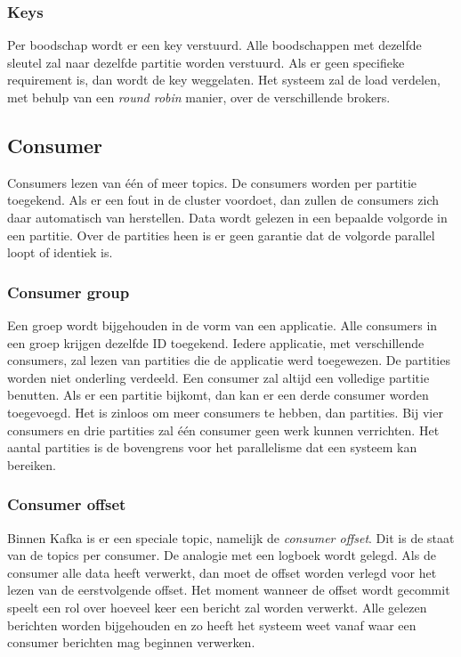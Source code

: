 \documentclass[a4paper,10pt,twoside]{report}
\begin{document}
\subsubsection{Keys}

Per boodschap wordt er een key verstuurd. Alle boodschappen met dezelfde sleutel zal naar dezelfde partitie worden verstuurd. Als er geen specifieke requirement is, dan wordt de key weggelaten. Het systeem zal de load verdelen, met behulp van een \textit{round robin} manier, over de verschillende brokers.

\subsection{Consumer}

Consumers lezen van één of meer topics. De consumers worden per partitie toegekend. Als er een fout in de cluster voordoet, dan zullen de consumers zich daar automatisch van herstellen. Data wordt gelezen in een bepaalde volgorde in een partitie. Over de partities heen is er geen garantie dat de volgorde parallel loopt of identiek is.

\subsubsection{Consumer group}

Een groep wordt bijgehouden in de vorm van een applicatie. Alle consumers in een groep krijgen dezelfde ID toegekend. Iedere applicatie, met verschillende consumers, zal lezen van partities die de applicatie werd toegewezen. De partities worden niet onderling verdeeld. Een consumer zal altijd een volledige partitie benutten. Als er een partitie bijkomt, dan kan er een derde consumer worden toegevoegd. Het is zinloos om meer consumers te hebben, dan partities. Bij vier consumers en drie partities zal één consumer geen werk kunnen verrichten. Het aantal partities is de bovengrens voor het parallelisme dat een systeem kan bereiken.

\subsubsection{Consumer offset}

Binnen Kafka is er een speciale topic, namelijk de \textit{consumer offset}. Dit is de staat van de topics per consumer. De analogie met een logboek wordt gelegd. Als de consumer alle data heeft verwerkt, dan moet de offset worden verlegd voor het lezen van de eerstvolgende offset. Het moment wanneer de offset wordt gecommit speelt een rol over hoeveel keer een bericht zal worden verwerkt. Alle gelezen berichten worden bijgehouden en zo heeft het systeem weet vanaf waar een consumer berichten mag beginnen verwerken. 
\end{document}
